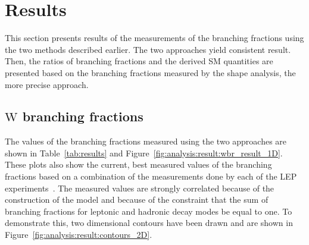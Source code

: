 \section{Results}
\label{sec:analysis:result}


This section presents results of the measurements of the branching
fractions using the two methods described earlier. 
The two approaches yield consistent result.
Then, the ratios of branching
fractions and the derived SM quantities are presented based on the branching
fractions measured by the shape analysis, the more precise approach.


\subsection{$\mathrm{W}$ branching fractions}
\label{sec:analysis:result:BWl}
The values of the
branching fractions measured using the two approaches are shown in
Table~\ref{tab:results} and Figure~\ref{fig:analysis:result:wbr_result_1D}.  These plots
also show the current, best measured values of the \PW branching fractions
based on a combination of the measurements done by each of the LEP
experiments~\cite{Schael:2013ita}.  The measured values are strongly
correlated because of the construction of the model and because of the
constraint that the sum of branching fractions for leptonic and hadronic
decay modes be equal to one.  To demonstrate this, two dimensional
contours have been drawn and are shown in Figure~\ref{fig:analysis:result:contours_2D}.


